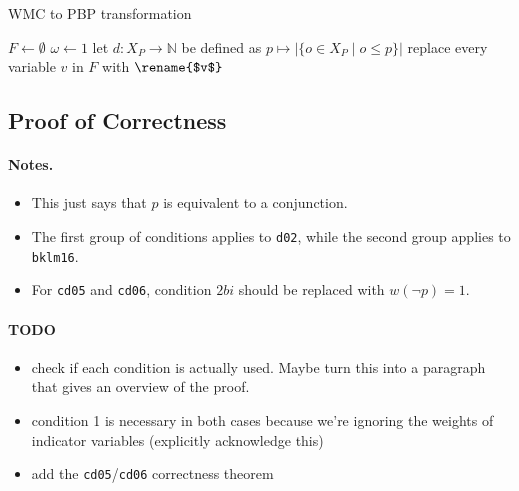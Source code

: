 \documentclass[runningheads]{llncs}
\begin{document}
\begin{algorithm}[t]
  \caption{WMC to PBP transformation}
  \label{alg:transformation}
  $F \gets \emptyset$\;
  $\omega \gets 1$\;
  let $d\colon X_P \to \mathbb{N}$ be defined as $p \mapsto |\{ o \in X_P \mid o
  \le p \}|$\;
  replace every variable $v$ in $F$ with $\rename{$v$}$\;
  \;
\end{algorithm}

\subsection{Proof of Correctness}

\paragraph{Notes.}
\begin{itemize}
\item This just says that $p$ is equivalent to a conjunction.
\item The first group of conditions applies to \texttt{d02}, while the second
  group applies to \texttt{bklm16}.
\item For \texttt{cd05} and \texttt{cd06}, condition $2bi$ should be replaced
  with $w(\neg p) = 1$.
\end{itemize}

\paragraph{TODO}
\begin{itemize}
\item check if each condition is actually used. Maybe turn this into a paragraph
  that gives an overview of the proof.
\item condition 1 is necessary in both cases because we're ignoring the weights
  of indicator variables (explicitly acknowledge this)
\item add the \texttt{cd05}/\texttt{cd06} correctness theorem
\end{itemize}
\end{document}
